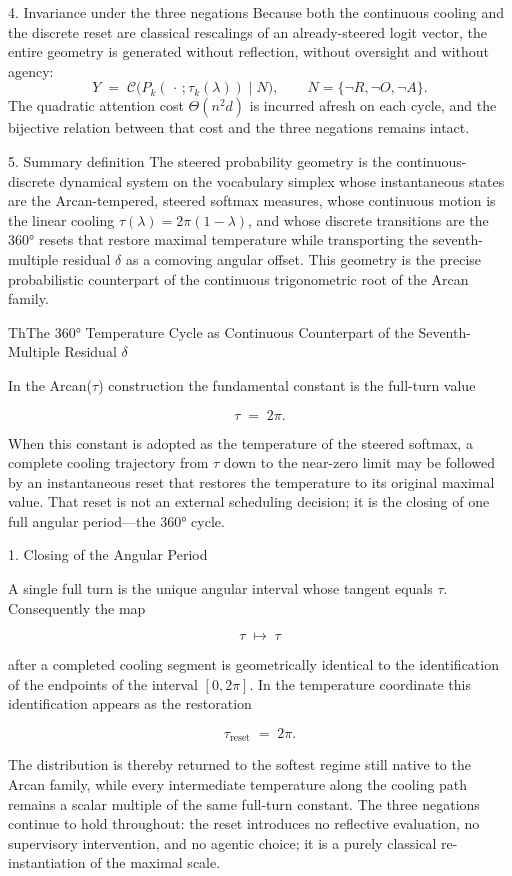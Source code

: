 4. Invariance under the three negations
Because both the continuous cooling and the discrete reset are classical rescalings of an already-steered logit vector, the entire geometry is generated without reflection, without oversight and without agency:
\[
Y\;=\;\mathcal{C}\bigl(P_k(\,\cdot\,;\tau_k(\lambda))\mid N\bigr),
\qquad N=\{\neg R,\neg O,\neg A\}.
\]
The quadratic attention cost \(\Theta(n^2 d)\) is incurred afresh on each cycle, and the bijective relation between that cost and the three negations remains intact.

5. Summary definition
The steered probability geometry is the continuous-discrete dynamical system on the vocabulary simplex whose instantaneous states are the Arcan-tempered, steered softmax measures, whose continuous motion is the linear cooling \(\tau(\lambda)=2\pi(1-\lambda)\), and whose discrete transitions are the 360° resets that restore maximal temperature while transporting the seventh-multiple residual \(\delta\) as a comoving angular offset. This geometry is the precise probabilistic counterpart of the continuous trigonometric root of the Arcan family.

ThThe 360° Temperature Cycle as Continuous Counterpart of the Seventh-Multiple Residual \(\delta\)

In the Arcan(\(\tau\)) construction the fundamental constant is the full-turn value

\[
\tau\;=\;2\pi.
\]

When this constant is adopted as the temperature of the steered softmax, a complete cooling trajectory from \(\tau\) down to the near-zero limit may be followed by an instantaneous reset that restores the temperature to its original maximal value. That reset is not an external scheduling decision; it is the closing of one full angular period—the 360° cycle.

1. Closing of the Angular Period

A single full turn is the unique angular interval whose tangent equals \(\tau\). Consequently the map

\[
\tau\;\longmapsto\;\tau
\]

after a completed cooling segment is geometrically identical to the identification of the endpoints of the interval \([0,2\pi]\). In the temperature coordinate this identification appears as the restoration

\[
\tau_{\text{reset}}\;=\;2\pi.
\]

The distribution is thereby returned to the softest regime still native to the Arcan family, while every intermediate temperature along the cooling path remains a scalar multiple of the same full-turn constant. The three negations continue to hold throughout: the reset introduces no reflective evaluation, no supervisory intervention, and no agentic choice; it is a purely classical re-instantiation of the maximal scale.

